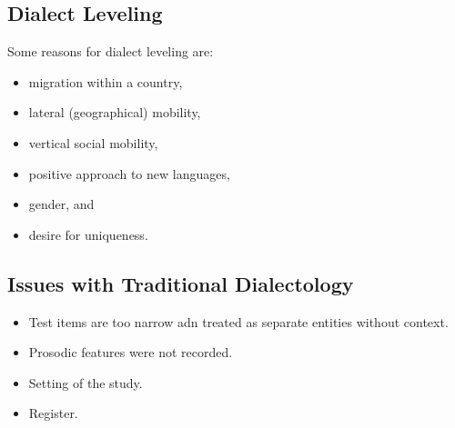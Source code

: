 \documentclass[../main.tex]{subfiles}
\begin{document}

        \subsection{Dialect Leveling}
        Some reasons for dialect leveling are: \begin{itemize}
            \item migration within a country,
            \item lateral (geographical) mobility,
            \item vertical social mobility,
            \item positive approach to new languages,
            \item gender, and
            \item desire for uniqueness.
        \end{itemize}
        \subsection{Issues with Traditional Dialectology}
        \begin{itemize}
            \item Test items are too narrow adn treated as separate entities without context.
            \item Prosodic features were not recorded.
            \item Setting of the study.
            \item Register.
        \end{itemize}
        
\end{document}
